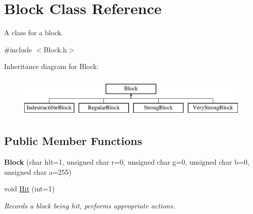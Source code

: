 \hypertarget{class_block}{}\section{Block Class Reference}
\label{class_block}


A class for a block.  




{\ttfamily \#include $<$Block.\+h$>$}

Inheritance diagram for Block\+:\begin{figure}[H]
\begin{center}
\leavevmode
\includegraphics[height=2.000000cm]{class_block}
\end{center}
\end{figure}
\subsection*{Public Member Functions}
\begin{DoxyCompactItemize}
\item 
\mbox{\label{class_block_ab79a68da4bbf6a22e1d91ac81d30ade8}} 
{\bfseries Block} (char hlt=1, unsigned char r=0, unsigned char g=0, unsigned char b=0, unsigned char a=255)
\item 
void \hyperlink{class_block_aabe6fcade4ece2795cf4ada1f0241442}{Hit} (int=1)
\begin{DoxyCompactList}\small\item\em Records a block being hit, performs appropriate actions. \end{DoxyCompactList}\end{DoxyCompactItemize}
